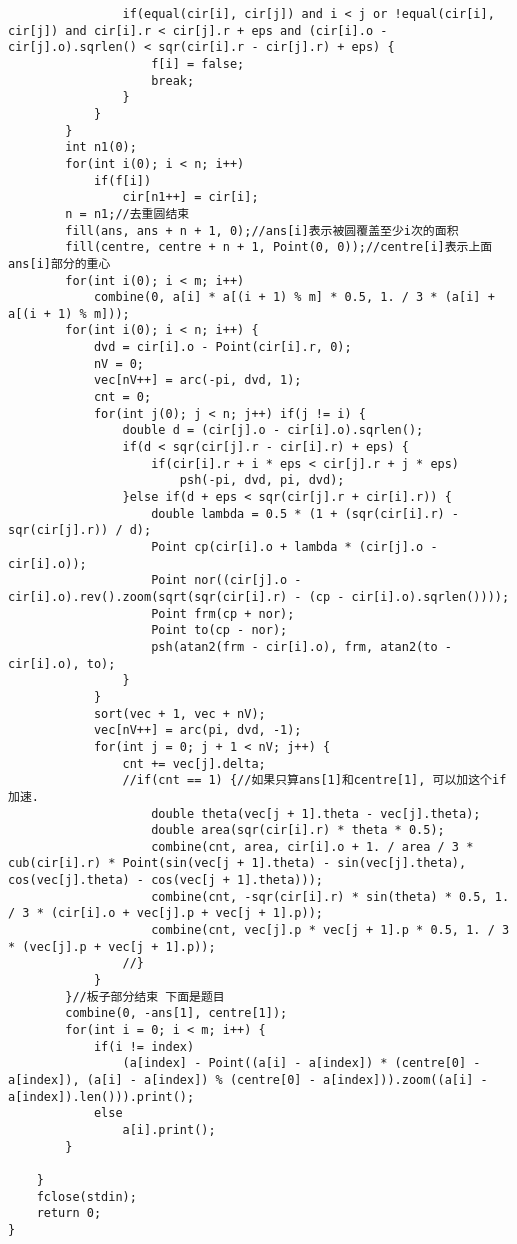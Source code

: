 \begin{lstlisting}
				if(equal(cir[i], cir[j]) and i < j or !equal(cir[i], cir[j]) and cir[i].r < cir[j].r + eps and (cir[i].o - cir[j].o).sqrlen() < sqr(cir[i].r - cir[j].r) + eps) {
					f[i] = false;
					break;
				}
			}
		}
		int n1(0);
		for(int i(0); i < n; i++)
			if(f[i])
				cir[n1++] = cir[i];
		n = n1;//去重圆结束
		fill(ans, ans + n + 1, 0);//ans[i]表示被圆覆盖至少i次的面积
		fill(centre, centre + n + 1, Point(0, 0));//centre[i]表示上面ans[i]部分的重心
		for(int i(0); i < m; i++) 
			combine(0, a[i] * a[(i + 1) % m] * 0.5, 1. / 3 * (a[i] + a[(i + 1) % m]));
		for(int i(0); i < n; i++) {
			dvd = cir[i].o - Point(cir[i].r, 0);
			nV = 0;
			vec[nV++] = arc(-pi, dvd, 1);
			cnt = 0;
			for(int j(0); j < n; j++) if(j != i) {
				double d = (cir[j].o - cir[i].o).sqrlen();
				if(d < sqr(cir[j].r - cir[i].r) + eps) {
					if(cir[i].r + i * eps < cir[j].r + j * eps)
						psh(-pi, dvd, pi, dvd);
				}else if(d + eps < sqr(cir[j].r + cir[i].r)) {
					double lambda = 0.5 * (1 + (sqr(cir[i].r) - sqr(cir[j].r)) / d);
					Point cp(cir[i].o + lambda * (cir[j].o - cir[i].o));
					Point nor((cir[j].o - cir[i].o).rev().zoom(sqrt(sqr(cir[i].r) - (cp - cir[i].o).sqrlen())));
					Point frm(cp + nor);
					Point to(cp - nor);
					psh(atan2(frm - cir[i].o), frm, atan2(to - cir[i].o), to);
				}
			}
			sort(vec + 1, vec + nV);
			vec[nV++] = arc(pi, dvd, -1);
			for(int j = 0; j + 1 < nV; j++) {
				cnt += vec[j].delta;
				//if(cnt == 1) {//如果只算ans[1]和centre[1], 可以加这个if加速.
					double theta(vec[j + 1].theta - vec[j].theta);
					double area(sqr(cir[i].r) * theta * 0.5);
					combine(cnt, area, cir[i].o + 1. / area / 3 * cub(cir[i].r) * Point(sin(vec[j + 1].theta) - sin(vec[j].theta), cos(vec[j].theta) - cos(vec[j + 1].theta)));
					combine(cnt, -sqr(cir[i].r) * sin(theta) * 0.5, 1. / 3 * (cir[i].o + vec[j].p + vec[j + 1].p));
					combine(cnt, vec[j].p * vec[j + 1].p * 0.5, 1. / 3 * (vec[j].p + vec[j + 1].p));
				//}
			}
		}//板子部分结束 下面是题目
		combine(0, -ans[1], centre[1]);
		for(int i = 0; i < m; i++) {
			if(i != index)
				(a[index] - Point((a[i] - a[index]) * (centre[0] - a[index]), (a[i] - a[index]) % (centre[0] - a[index])).zoom((a[i] - a[index]).len())).print();
			else
				a[i].print();
		}
 
	}
	fclose(stdin);
	return 0;
}
\end{lstlisting}
